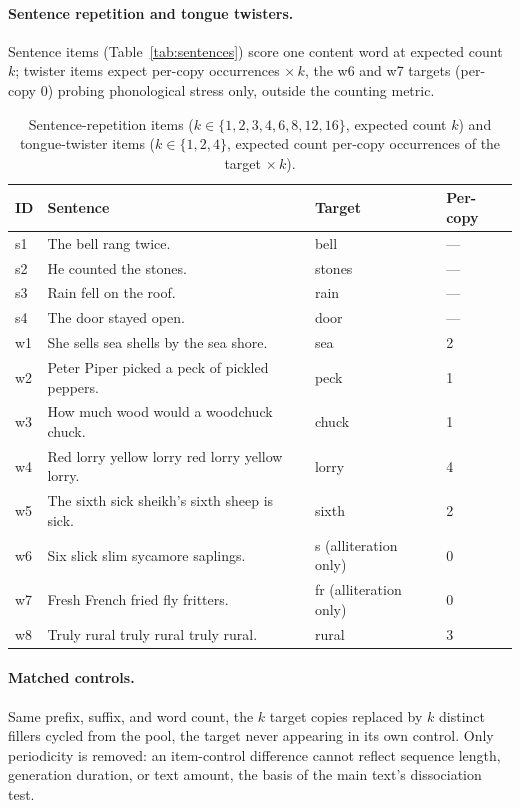 \paragraph{Sentence repetition and tongue twisters.} Sentence items
(Table~\ref{tab:sentences}) score one content word at expected count $k$;
twister items expect per-copy occurrences $\times\,k$, the w6 and w7
targets (per-copy $0$) probing phonological stress only, outside the
counting metric.
\begin{table}[tp]
\centering
\caption{Sentence-repetition items ($k \in \{1,2,3,4,6,8,12,16\}$,
expected count $k$) and tongue-twister items ($k\in\{1,2,4\}$, expected
count per-copy occurrences of the target $\times\,k$).}
\label{tab:sentences}\label{tab:twisters}
\small
\begin{tabular}{@{}lp{11.5cm}ll@{}}
\toprule
ID & Sentence & Target & Per-copy \\
\midrule
s1 & The bell rang twice. & bell & --- \\
s2 & He counted the stones. & stones & --- \\
s3 & Rain fell on the roof. & rain & --- \\
s4 & The door stayed open. & door & --- \\
\midrule
w1 & She sells sea shells by the sea shore. & sea & 2 \\
w2 & Peter Piper picked a peck of pickled peppers. & peck & 1 \\
w3 & How much wood would a woodchuck chuck. & chuck & 1 \\
w4 & Red lorry yellow lorry red lorry yellow lorry. & lorry & 4 \\
w5 & The sixth sick sheikh's sixth sheep is sick. & sixth & 2 \\
w6 & Six slick slim sycamore saplings. & s (alliteration only) & 0 \\
w7 & Fresh French fried fly fritters. & fr (alliteration only) & 0 \\
w8 & Truly rural truly rural truly rural. & rural & 3 \\
\bottomrule
\end{tabular}
\end{table}

\paragraph{Matched controls.} Same prefix, suffix, and word count, the
$k$ target copies replaced by $k$ distinct fillers cycled from the pool,
the target never appearing in its own control. Only periodicity is
removed: an item-control difference cannot reflect sequence length,
generation duration, or text amount, the basis of the main text's
dissociation test.

